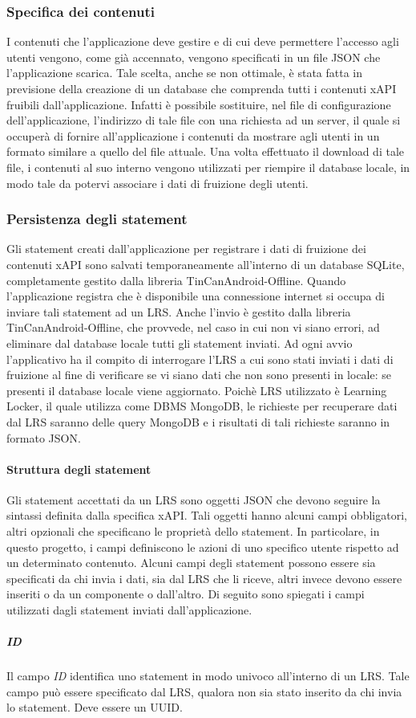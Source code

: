 \documentclass[../Tesi.tex]{subfiles}
\begin{document}
			\subsubsection{Specifica dei contenuti}
			I contenuti che l'applicazione deve gestire e di cui deve permettere l'accesso agli utenti vengono, come già accennato, vengono specificati in un file JSON che l'applicazione scarica. Tale scelta, anche se non ottimale, è stata fatta in previsione della creazione di un database che comprenda tutti i contenuti xAPI fruibili dall'applicazione. Infatti è possibile sostituire, nel file di configurazione dell'applicazione, l'indirizzo di tale file con una richiesta ad un server, il quale si occuperà di fornire all'applicazione i contenuti da mostrare agli utenti in un formato similare a quello del file attuale. Una volta effettuato il download di tale file, i contenuti al suo interno vengono utilizzati per riempire il database locale, in modo tale da potervi associare i dati di fruizione degli utenti.

			\subsubsection{Persistenza degli statement}
			Gli statement creati dall'applicazione per registrare i dati di fruizione dei contenuti xAPI sono salvati temporaneamente all'interno di un database SQLite, completamente gestito dalla libreria TinCanAndroid-Offline. Quando l'applicazione registra che è disponibile una connessione internet si occupa di inviare tali statement ad un LRS. Anche l'invio è gestito dalla libreria TinCanAndroid-Offline, che provvede, nel caso in cui non vi siano errori, ad eliminare dal database locale tutti gli statement inviati. Ad ogni avvio l'applicativo ha il compito di interrogare l'LRS a cui sono stati inviati i dati di fruizione al fine di verificare se vi siano dati che non sono presenti in locale: se presenti il database locale viene aggiornato. Poichè LRS utilizzato è Learning Locker, il quale utilizza come DBMS MongoDB, le richieste per recuperare dati dal LRS saranno delle query MongoDB e i risultati di tali richieste saranno in formato JSON.
				\paragraph{Struttura degli statement}
				Gli statement accettati da un LRS sono oggetti JSON che devono seguire la sintassi definita dalla specifica xAPI. Tali oggetti hanno alcuni campi obbligatori, altri opzionali che specificano le proprietà dello statement. In particolare, in questo progetto, i campi definiscono le azioni di uno specifico utente rispetto ad un determinato contenuto. Alcuni campi degli statement possono essere sia specificati da chi invia i dati, sia dal LRS che li riceve, altri invece devono essere inseriti o da un componente o dall'altro. Di seguito sono spiegati i campi utilizzati dagli statement inviati dall'applicazione.
					\subparagraph{ID}
					Il campo \textit{ID} identifica uno statement in modo univoco all'interno di un LRS. Tale campo può essere specificato dal LRS, qualora non sia stato inserito da chi invia lo statement. Deve essere un UUID.
\end{document}

